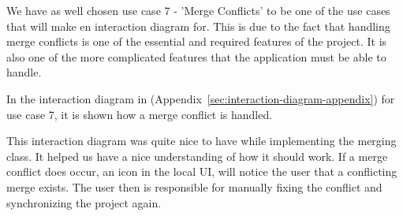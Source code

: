 We have as well chosen use case 7 - 'Merge Conflicts' to be one of the use cases that will make en interaction diagram for. This is due to the fact
that handling merge conflicts is one of the essential and required features of the project. It is also one of the more complicated features that
the application must be able to handle.

In the interaction diagram in (Appendix~\ref{sec:interaction-diagram-appendix}) for use case 7, it is shown how a merge conflict is handled. 

This interaction diagram was quite nice to have while implementing the merging class. It helped us have a nice understanding of how it should work. If
a merge conflict does occur, an icon in the local UI, will notice the user that a conflicting merge exists. The user then is responsible for manually 
fixing the conflict and synchronizing the project again. 
